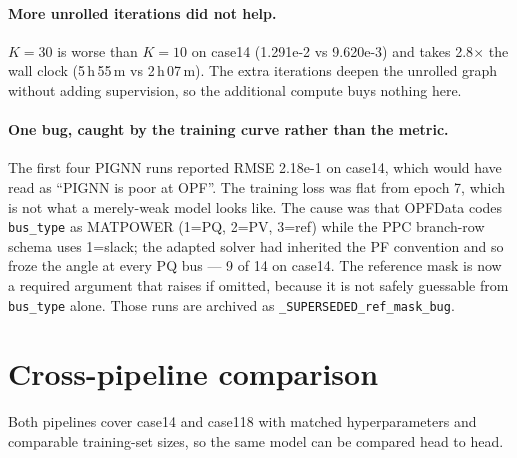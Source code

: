 \documentclass[10pt]{article}
\begin{document}
\paragraph{More unrolled iterations did not help.} \(K{=}30\) is worse than
\(K{=}10\) on case14 (1.291e-2 vs 9.620e-3) and takes 2.8\(\times\) the wall
clock (5\,h\,55\,m vs 2\,h\,07\,m). The extra iterations deepen the unrolled
graph without adding supervision, so the additional compute buys nothing here.

\paragraph{One bug, caught by the training curve rather than the metric.} The
first four PIGNN runs reported RMSE 2.18e-1 on case14, which would have read as
``PIGNN is poor at OPF''. The training loss was flat from epoch 7, which is not
what a merely-weak model looks like. The cause was that OPFData codes
\texttt{bus\_type} as MATPOWER (1=PQ, 2=PV, 3=ref) while the PPC branch-row
schema uses 1=slack; the adapted solver had inherited the PF convention and so
froze the angle at every PQ bus --- 9 of 14 on case14. The reference mask is now
a required argument that raises if omitted, because it is not safely guessable
from \texttt{bus\_type} alone. Those runs are archived as
\texttt{\_SUPERSEDED\_ref\_mask\_bug}.

\section{Cross-pipeline comparison}
\label{sec:cross}

Both pipelines cover case14 and case118 with matched hyperparameters and
comparable training-set sizes, so the same model can be compared head to head.
\end{document}
